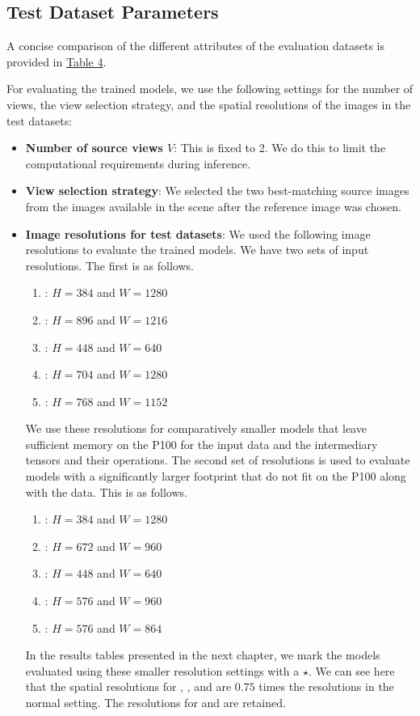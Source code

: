 \subsection{Test Dataset Parameters}\label{subsec:test-dataset-params}
A concise comparison of the different attributes of the evaluation datasets is provided in \hyperref[tab:test-sets]{Table 4}. \par
For evaluating the trained models, we use the following settings for the number of views, the view selection strategy, and the spatial resolutions of the images in the test datasets:
\begin{itemize}
    \item \textbf{Number of source views \(V\)}: This is fixed to 2. We do this to limit the computational requirements during inference. 
    \item \textbf{View selection strategy}: We selected the two best-matching source images from the images available in the scene after the reference image was chosen. 
    \item \textbf{Image resolutions for test datasets}: We used the following image resolutions to evaluate the trained models. We have two sets of input resolutions. The first is as follows.
    \begin{enumerate}
        \item \textbf{\kitti}: $H=384$ and $W=1280$
        \item  \textbf{\dtu}: $H=896$ and $W=1216$
        \item \textbf{\scannet}: $H=448$ and $W=640$
        \item \textbf{\tanksandtemples}: $H=704$ and $W=1280$
        \item \textbf{\ethd}: $H=768$ and $W=1152$
    \end{enumerate}
    We use these resolutions for comparatively smaller models that leave sufficient memory on the P100 for the input data and the intermediary tensors and their operations. 
    The second set of resolutions is used to evaluate models with a significantly larger footprint that do not fit on the P100 along with the data. This is as follows.
        \begin{enumerate}
        \item \textbf{\kitti}: $H=384$ and $W=1280$
        \item  \textbf{\dtu}: $H=672$ and $W=960$
        \item \textbf{\scannet}: $H=448$ and $W=640$
        \item \textbf{\tanksandtemples}: $H=576$ and $W=960$
        \item \textbf{\ethd}: $H=576$ and $W=864$
    \end{enumerate}
    In the results tables presented in the next chapter, we mark the models evaluated using these smaller resolution settings with a \(\star\). We can see here that the spatial resolutions for {\dtu}, {\ethd}, and {\tanksandtemples} are \(0.75\) times the resolutions in the normal setting. The resolutions for {\kitti} and {\scannet} are retained. 
\end{itemize}
 
 
